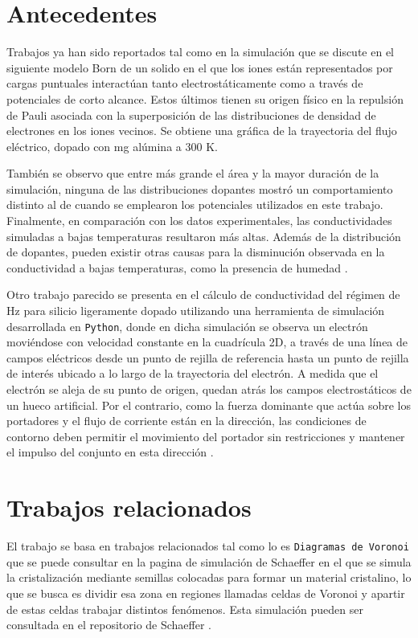 \documentclass[9pt,twocolumn,twoside]{osajnl}
\begin{document}
\section{Antecedentes}
Trabajos ya han sido reportados tal como en la simulación que se discute en el siguiente modelo Born de un solido en el que los iones están representados por cargas puntuales interactúan tanto electrostáticamente como a través de potenciales de corto alcance.
Estos últimos tienen su origen físico en la repulsión de Pauli asociada con la superposición de las distribuciones de densidad de electrones en los iones vecinos. Se obtiene una gráfica de la trayectoria del flujo eléctrico, dopado con mg alúmina a 300 K. 

También se observo que entre más grande el área y la mayor duración de la simulación, ninguna de las distribuciones dopantes mostró un comportamiento distinto al de cuando se emplearon los potenciales utilizados en este trabajo.
Finalmente, en comparación con los datos experimentales, las conductividades simuladas a bajas temperaturas resultaron más altas. Además de la distribución de dopantes, pueden existir otras causas para la disminución observada en la conductividad a bajas temperaturas, como la presencia de humedad \cite{wang2014molecular}. 


Otro trabajo parecido se presenta en el cálculo de conductividad del régimen de Hz para silicio ligeramente dopado utilizando una 
herramienta de simulación desarrollada en \texttt{Python}, donde en dicha simulación se observa un electrón moviéndose con velocidad constante en la cuadrícula 2D, a través de una línea de campos eléctricos desde un punto de rejilla de referencia hasta un punto de rejilla de interés ubicado a lo largo de la trayectoria del electrón. A medida que el electrón se aleja de su punto de origen, quedan atrás los campos electrostáticos de un hueco artificial. Por el contrario, como la fuerza dominante que actúa sobre los portadores y el flujo de corriente están en la dirección, las condiciones de contorno deben permitir el movimiento del portador sin restricciones y mantener el impulso del conjunto en esta dirección \cite{willis2010terahertz}.

\section{Trabajos relacionados}
El trabajo se basa en trabajos relacionados tal como lo es \texttt{Diagramas de Voronoi} que se puede consultar en la pagina de simulación de Schaeffer \cite{voronoi} en el que se simula la cristalización mediante semillas colocadas para formar un material cristalino, lo que se busca es dividir esa zona en regiones llamadas celdas de Voronoi y apartir de estas celdas trabajar distintos fenómenos. Esta simulación pueden ser consultada en el repositorio de Schaeffer \cite{elisa}. 
\end{document}
